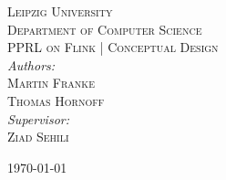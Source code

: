 \begin{titlepage}

	\begin{flushright}
	
		\textsc{\small Leipzig University}\\[0.1cm]
		\textsc{\small Department of Computer Science}\\[2cm]
		
		\textsc{\LARGE PPRL on Flink | Conceptual Design}\\[2cm]
		
		
        \emph{Authors:}\\[0.2cm]
		\textsc{Martin Franke}\\[0.2cm]
		\textsc{Thomas Hornoff}\\[1.2cm]
        \emph{Supervisor:}\\[0.2cm]
        \textsc{Ziad Sehili}\\[0.2cm]
		
		\vfill
		
		{\today}
	
	\end{flushright}
	
\end{titlepage}
